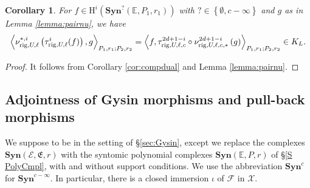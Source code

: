 \documentclass[asterisque,english]{smfart}
\newtheorem{cor}[theo]{Corollary}
\begin{document}
\begin{cor}\label{cor:adjointdualityrig} For $f\in \mathrm{H}^{i}\left( \mathbf{Syn}^{?}\left( \mathbb{E}
,P_{1},r_{1}\right) \right) $ with $?\in \left\{\emptyset ,c-\infty
\right\} $ and $g$ as in Lemma \ref{lemma:pairnu}, we have 
$$
\left\langle \nu_{{\rm rig},U,\ell}^{\ast,i}\left( \tau _{\mathrm{rig},U,\ell}^i(f)\right) ,g\right\rangle
_{P_{1},r_{1};P_{2},r_{2}}=\left\langle f, \tau _{\mathrm{rig},U,\ell,c}^{2d+1-i}\circ \nu_{\mathrm{rig},U,\ell,c,\ast}^{2d+1-i}  \left(
g\right) \right\rangle _{P_{1},r_{1};P_{2},r_{2}}\in K_L.
$$
\end{cor} 
\begin{proof} It follows from  Corollary \ref{cor:compdual} and Lemma \ref{lemma:pairnu}.
\end{proof}




\subsection{Adjointness of Gysin morphisms and pull-back morphisms}\label{SS PolyAdj}

We suppose to be in the setting of \S \ref{sec:Gysin}, except we replace the complexes $\mathbf{Syn}\left( \mathcal{E},\mathfrak{E},r\right) $ with the  syntomic polynomial complexes $\mathbf{Syn}\left(\mathbb{E},P,r\right) $ of \S \ref{S PolyCmpl}, with and without support conditions. We use
the abbreviation $\mathbf{Syn}^c$ for $\mathbf{Syn}^{c-\infty} $. In particular, there is a closed
immersion $\iota $ of $\mathcal{F}$ in $\mathcal{X}$. 
\end{document}

